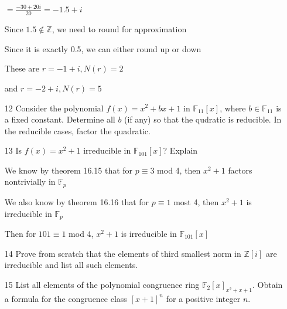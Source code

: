 \documentclass[12pt]{article}
\begin{document}
\begin{itemize}
		$=\frac{-30+20i}{20} = -1.5 + i$

		Since $1.5 \not \in \mathbb{Z}$, we need to round for approximation

		Since it is exactly 0.5, we can either round up or down

		These are $r = -1 + i, N(r) = 2$

		and $r = -2 + i, N(r) = 5$

	\item[12] Consider the polynomial $f(x) = x^2 + bx + 1$ in $\mathbb{F}_{11}[x]$, where $b\in \mathbb{F}_{11}$ is a fixed constant. Determine all $b$ (if any) so that the qudratic is reducible. In the reducible cases, factor the quadratic.

	\item[13] Is $f(x) = x^2 + 1$ irreducible in $\mathbb{F}_{101}[x]$? Explain

		We know by theorem 16.15 that for $p \equiv 3$ mod 4, then $x^2 + 1$ factors nontrivially in $\mathbb{F}_p$

		We also know by theorem 16.16 that for $p \equiv 1$ most 4, then $x^2 + 1$ is irreducible in $\mathbb{F}_p$

		Then for $101 \equiv 1$ mod 4, $x^2 + 1$ is irreducible in $\mathbb{F}_{101}[x]$

	\item[14] Prove from scratch that the elements of third smallest norm in $\mathbb{Z}[i]$ are irreducible and list all such elements.

	\item[15] List all elements of the polynomial congruence ring $\mathbb{F}_2[x]_{x^2 + x + 1}$. Obtain a formula for the congruence class $[x+1]^n$ for a positive integer $n$.
\end{itemize}
\end{document}
